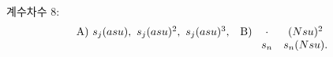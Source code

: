 
\noindent 계수차수 8:
\[
\begin{array}{ll}
\text{A)}\ s_j(asu),\ s_j(asu)^2,\ s_j(asu)^3,
&
\text{B)}\ \begin{array}[t]{cc}
\cdot&(Nsu)^2\\
s_n&s_n(Nsu).
\end{array}
\end{array}
\]
